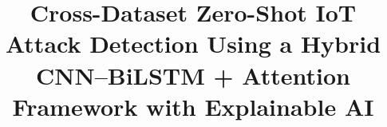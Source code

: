 \documentclass[a4paper,fleqn]{cas-sc}
\begin{document}
\let\WriteBookmarks\relax
\def\floatpagepagefraction{0.5}
\def\textpagefraction{.1}
\renewcommand{\topfraction}{.85}
\renewcommand{\bottomfraction}{.7}
\renewcommand{\textfraction}{.15}
\renewcommand{\floatpagefraction}{.66}
\renewcommand{\dbltopfraction}{.85}
\renewcommand{\dblfloatpagefraction}{.66}
\setcounter{topnumber}{9}
\setcounter{bottomnumber}{9}
\setcounter{totalnumber}{20}
\setcounter{dbltopnumber}{9}



\title [mode = title]{Cross-Dataset Zero-Shot {IoT} Attack Detection Using a Hybrid {CNN--BiLSTM + Attention} Framework with Explainable {AI}}  



%







\end{document}
